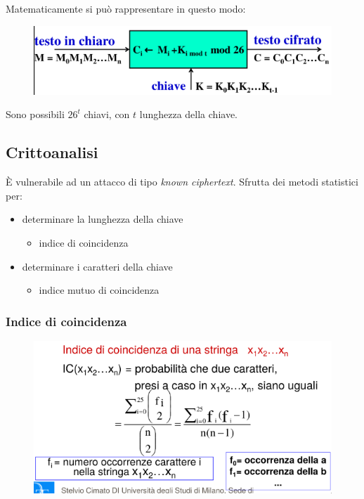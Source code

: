 \noindent Matematicamente si può rappresentare in questo modo:

\begin{figure}[H]
    \centering
    \includegraphics[width=0.8\linewidth]{chapters/chap02/images/vigenere2.png}
\end{figure}

\noindent Sono possibili $26^t$ chiavi, con $t$ lunghezza della chiave.


\subsection{Crittoanalisi}

È vulnerabile ad un attacco di tipo \textit{known ciphertext}. Sfrutta dei metodi statistici per:
\begin{itemize}
    \item determinare la lunghezza della chiave
    \begin{itemize}
        \item indice di coincidenza
    \end{itemize}
    \item determinare i caratteri della chiave 
    \begin{itemize}
        \item indice mutuo di coincidenza
    \end{itemize}
\end{itemize}

\subsubsection{Indice di coincidenza}

\begin{figure}[H]
    \centering
    \includegraphics[width=0.8\linewidth]{chapters/chap02/images/ic.png}
\end{figure}

